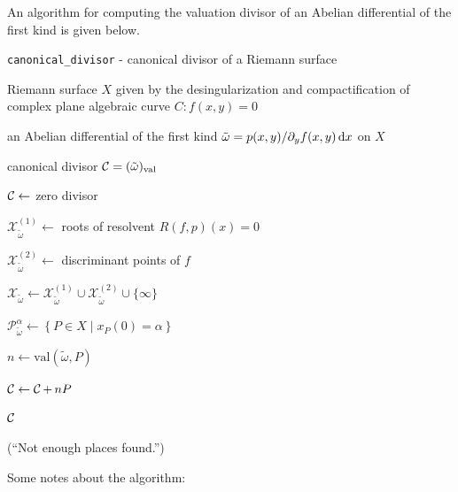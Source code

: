 An algorithm for computing the valuation divisor of an Abelian differential of
the first kind is given below.
\begin{algorithm}[H]
\caption{{\tt canonical\_divisor} - canonical divisor of a Riemann surface}
\label{alg:canonical}
\begin{algorithmic}[1]
  \Require Riemann surface $X$ given by the desingularization and
  compactification of complex plane algebraic curve $C : f(x,y) = 0$

  \Require an Abelian differential of the first kind $\tilde{\omega} =
  p(x,y) / \partial_y f(x,y) \,\mathrm{d}x$ on $X$

  \Ensure canonical divisor $\operatorname{\mathcal{C}} = (\tilde{\omega})_\text{val}$

  \State $\operatorname{\mathcal{C}} \gets$ zero divisor

  \State $\mathcal{X}_{\tilde{\omega}}^{(1)} \gets$ roots of resolvent
  $R(f,p)(x) = 0$

  \State $\mathcal{X}_{\tilde{\omega}}^{(2)} \gets$ discriminant points of $f$

  \State $\mathcal{X}_{\tilde{\omega}} \gets
  \mathcal{X}_{\tilde{\omega}}^{(1)} \cup
  \mathcal{X}_{\tilde{\omega}}^{(2)} \cup \{ \infty \}$


  \State $\mathcal{P}_{\tilde{\omega}}^\alpha \gets \left\{ P \in X \; |
  \; x_P(0) = \alpha \right\}$


  \State $n \gets \text{val}\left(\tilde{\omega},P\right)$

  \State $\operatorname{\mathcal{C}} \gets \operatorname{\mathcal{C}} + \,n P$

  \State \Return $\operatorname{\mathcal{C}}$
  \EndIf

  \EndFor

  \EndFor

  (``Not enough places found.'')

\end{algorithmic}
\end{algorithm}
Some notes about the algorithm:
